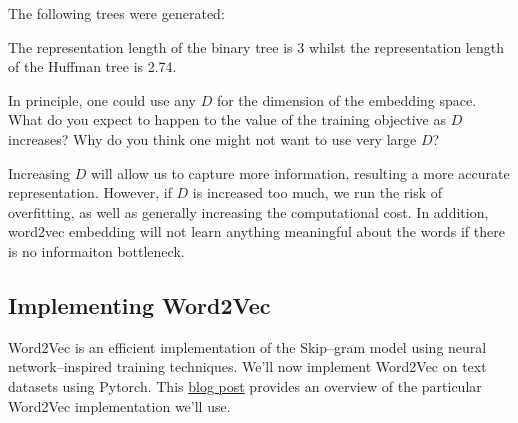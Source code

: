 \begin{solution}
 The following trees were generated:
 \begin{figure}[H]
  \end{figure}
 The representation length of the binary tree is 3 whilst the representation length of the Huffman tree is 2.74.

\end{solution}


\problem[3]
In principle, one could use any $D$ for the dimension of the embedding space.  What do you expect to happen to the value of the training objective as $D$ increases?  Why do you think one might not want to use very large $D$?

\begin{solution}
 Increasing $D$ will allow us to capture more information, resulting a more accurate representation. However, if $D$ is increased too much, we run the risk of overfitting, as well as generally increasing the computational cost. In addition, word2vec embedding will not learn anything meaningful about the words if there is no informaiton bottleneck.
\end{solution}

\subsection{Implementing Word2Vec}
Word2Vec is an efficient implementation of the Skip--gram model using neural network--inspired training techniques. We'll now implement Word2Vec on text datasets using Pytorch.  This  
\href{http://mccormickml.com/2016/04/19/word2vec-tutorial-the-skip-gram-model/}{blog post} provides an overview of the particular Word2Vec implementation we'll use.

